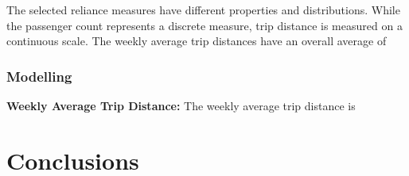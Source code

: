 \documentclass[11pt]{article}
\begin{document}
The selected reliance measures have different properties and distributions.
While the passenger count represents a discrete measure, trip distance is measured on a continuous scale.
The weekly average trip distances have an overall average of 

\subsubsection{Modelling}

\textbf{Weekly Average Trip Distance:}
The weekly average trip distance is






\section{Conclusions}
\end{document}
